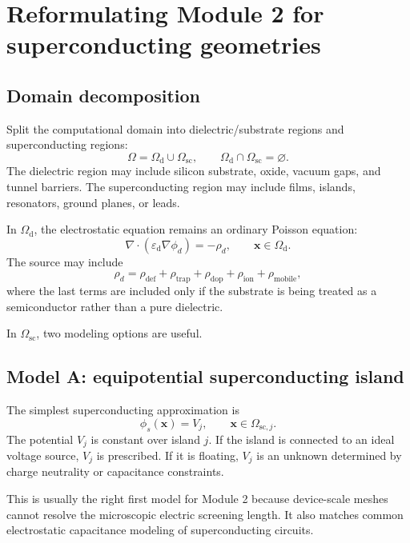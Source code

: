 \documentclass[11pt]{article}
\newcommand{\Om}{\Omega}
\newcommand{\Omd}{\Omega_{\mathrm{d}}}
\newcommand{\Oms}{\Omega_{\mathrm{sc}}}
\newcommand{\epsd}{\varepsilon_{\mathrm{d}}}
\newcommand{\rhotrap}{\rho_{\mathrm{trap}}}
\newcommand{\rhodef}{\rho_{\mathrm{def}}}
\begin{document}
\section{Reformulating Module 2 for superconducting geometries}

\subsection{Domain decomposition}

Split the computational domain into dielectric/substrate regions and superconducting regions:
\begin{equation}
\Om = \Omd \cup \Oms,
\qquad
\Omd\cap\Oms=\varnothing.
\end{equation}
The dielectric region may include silicon substrate, oxide, vacuum gaps, and tunnel barriers. The superconducting region may include films, islands, resonators, ground planes, or leads.

In $\Omd$, the electrostatic equation remains an ordinary Poisson equation:
\begin{equation}
\boxed{\nabla\cdot(\epsd\nabla\phi_d)=-\rho_d, \qquad \mathbf{x}\in\Omd.}
\label{eq:dielectric_poisson}
\end{equation}
The source may include
\begin{equation}
\rho_d = \rhodef + \rhotrap + \rho_{\mathrm{dop}} + \rho_{\mathrm{ion}} + \rho_{\mathrm{mobile}},
\end{equation}
where the last terms are included only if the substrate is being treated as a semiconductor rather than a pure dielectric.

In $\Oms$, two modeling options are useful.

\subsection{Model A: equipotential superconducting island}

The simplest superconducting approximation is
\begin{equation}
\boxed{\phi_s(\mathbf{x}) = V_j,\qquad \mathbf{x}\in\Omega_{\mathrm{sc},j}.}
\label{eq:model_a_equipotential}
\end{equation}
The potential $V_j$ is constant over island $j$. If the island is connected to an ideal voltage source, $V_j$ is prescribed. If it is floating, $V_j$ is an unknown determined by charge neutrality or capacitance constraints.

This is usually the right first model for Module 2 because device-scale meshes cannot resolve the microscopic electric screening length. It also matches common electrostatic capacitance modeling of superconducting circuits.
\end{document}
